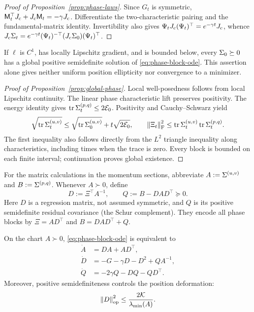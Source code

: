 \begin{proof}[Proof of Proposition~\ref{prop:phase-laws}]
Since \(G_t\) is symmetric,
\(\mathsf M_t^\top J_{\mathrm c}+J_{\mathrm c}\mathsf M_t=-\gamma J_{\mathrm c}\).
Differentiate the two-characteristic pairing and the fundamental-matrix
identity. Invertibility also gives
\(\Psi_tJ_{\mathrm c}(\Psi_t)^\top=e^{-\gamma t}J_{\mathrm c}\), whence
\(J_{\mathrm c}\Sigma_t=e^{-\gamma t}
(\Psi_t)^{-\top}(J_{\mathrm c}\Sigma_0)(\Psi_t)^\top\).
\end{proof}

\begin{proposition}\label{prop:global-phase}
If $\ell$ is $C^1$, has locally Lipschitz gradient, and is bounded below,
every $\Sigma_0\succeq0$ has a global positive semidefinite solution of
\eqref{eq:phase-block-ode}.  This assertion alone gives neither uniform position ellipticity
nor convergence to a minimizer.
\end{proposition}

\begin{proof}[Proof of Proposition~\ref{prop:global-phase}]
Local well-posedness follows from local Lipschitz continuity. The linear
phase characteristic lift preserves positivity. The energy identity gives
$\operatorname{tr}\Sigma^{(p,q)}_t\le2\mathcal E_0$. Positivity and Cauchy--Schwarz yield
\[
 \sqrt{\operatorname{tr}\Sigma^{(u,v)}_t}
 \le\sqrt{\operatorname{tr}\Sigma^{(u,v)}_0}+t\sqrt{2\mathcal E_0},\qquad
 \left\lVert \Xi_t \right\rVert_{\mathrm{F}}^2\le\operatorname{tr}\Sigma^{(u,v)}_t\operatorname{tr}\Sigma^{(p,q)}_t.
\]
The first inequality also follows directly from the $L^2$ triangle
inequality along characteristics, including times when the trace is zero.
Every block is bounded on each finite interval; continuation proves
global existence.
\end{proof}
For the matrix calculations in the momentum sections, abbreviate
$A:=\Sigma^{(u,v)}$ and $B:=\Sigma^{(p,q)}$. Whenever $A\succ0$, define
\begin{equation}\label{eq:regression}
 D:=\Xi^\top A^{-1},\qquad Q:=B-DAD^\top\succeq0.
\end{equation}
Here $D$ is a regression matrix, not assumed symmetric, and $Q$ is its
positive semidefinite residual covariance (the Schur complement).
They encode all phase blocks by $\Xi=AD^\top$ and $B=DAD^\top+Q$.
\begin{proposition}\label{prop:regression}
On the chart $A\succ0$, \eqref{eq:phase-block-ode} is equivalent to
\begin{equation}\label{eq:regression-ode}
 \begin{aligned}
 \dot A&=DA+AD^\top,\\
 \dot D&=-G-\gamma D-D^2+QA^{-1},\\
 \dot Q&=-2\gamma Q-DQ-QD^\top.
 \end{aligned}
\end{equation}
Moreover, positive semidefiniteness controls the position deformation:
\begin{equation}\label{eq:regression-bound-main}
 \left\lVert D \right\rVert_{\mathrm{op}}^2\le\frac{2\mathcal{K}}{\lambda_{\min}(A)}.
\end{equation}
\end{proposition}


